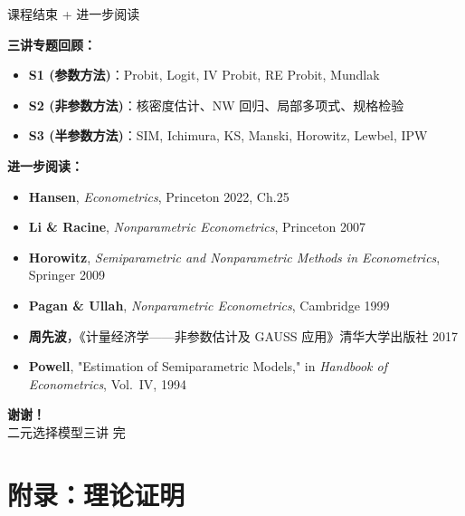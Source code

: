 \documentclass[aspectratio=169, 10pt]{beamer}
\begin{document}
\begin{frame}[shrink=12]{课程结束 + 进一步阅读}

  \begin{highlightbox}
    \textbf{三讲专题回顾：}
    \begin{itemize}\setlength{\itemsep}{1pt}
      \item \textbf{S1 (参数方法)}：Probit, Logit, IV Probit, RE Probit, Mundlak
      \item \textbf{S2 (非参数方法)}：核密度估计、NW 回归、局部多项式、规格检验
      \item \textbf{S3 (半参数方法)}：SIM, Ichimura, KS, Manski, Horowitz, Lewbel, IPW
    \end{itemize}
  \end{highlightbox}

  \begin{keybox}
    \textbf{进一步阅读：}
    \begin{itemize}\setlength{\itemsep}{1pt}
      \item \textbf{Hansen}, \emph{Econometrics}, Princeton 2022, Ch.25
      \item \textbf{Li \& Racine}, \emph{Nonparametric Econometrics}, Princeton 2007
      \item \textbf{Horowitz}, \emph{Semiparametric and Nonparametric Methods in Econometrics}, Springer 2009
      \item \textbf{Pagan \& Ullah}, \emph{Nonparametric Econometrics}, Cambridge 1999
      \item \textbf{周先波}，《计量经济学——非参数估计及 GAUSS 应用》清华大学出版社 2017
      \item \textbf{Powell}, "Estimation of Semiparametric Models," in \emph{Handbook of Econometrics}, Vol.~IV, 1994
    \end{itemize}
  \end{keybox}

  \begin{center}
  \vspace{0.5em}
  {\Huge \textcolor{SUFEGold}{\textbf{谢谢！}}}\\[1em]
  {\Large 二元选择模型三讲 完}
  \end{center}

\end{frame}

\appendix
\section{附录：理论证明}
\end{document}
